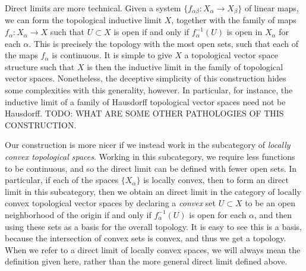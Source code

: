 Direct limits are more technical. Given a system $\{ f_{\alpha \beta}: X_\alpha \to X_\beta \}$ of linear maps, we can form the topological inductive limit $X$, together with the family of maps $f_\alpha: X_\alpha \to X$ such that $U \subset X$ is open if and only if $f_\alpha^{-1}(U)$ is open in $X_\alpha$ for each $\alpha$. This is precisely the topology with the most open sets, such that each of the maps $f_\alpha$ is continuous. It is simple to give $X$ a topological vector space structure such that $X$ is then the inductive limit in the family of topological vector spaces. Nonetheless, the deceptive simplicity of this construction hides some complexities with this generality, however. In particular, for instance, the inductive limit of a family of Hausdorff topological vector spaces need not be Hausdorff. TODO: WHAT ARE SOME OTHER PATHOLOGIES OF THIS CONSTRUCTION.

Our construction is more nicer if we instead work in the subcategory of \emph{locally convex topological spaces}. Working in this subcategory, we require less functions to be continuous, and so the direct limit can be defined with fewer open sets. In particular, if each of the spaces $\{ X_\alpha \}$ is locally convex, then to form an direct limit in this subcategory, then we obtain an direct limit in the category of locally convex topological vector spaces by declaring a \emph{convex} set $U \subset X$ to be an open neighborhood of the origin if and only if $f_\alpha^{-1}(U)$ is open for each $\alpha$, and then using these sets as a basis for the overall topology. It is easy to see this is a basis, because the intersection of convex sets is convex, and thus we get a topology. When we refer to a direct limit of locally convex spaces, we will always mean the definition given here, rather than the more general direct limit defined above.


